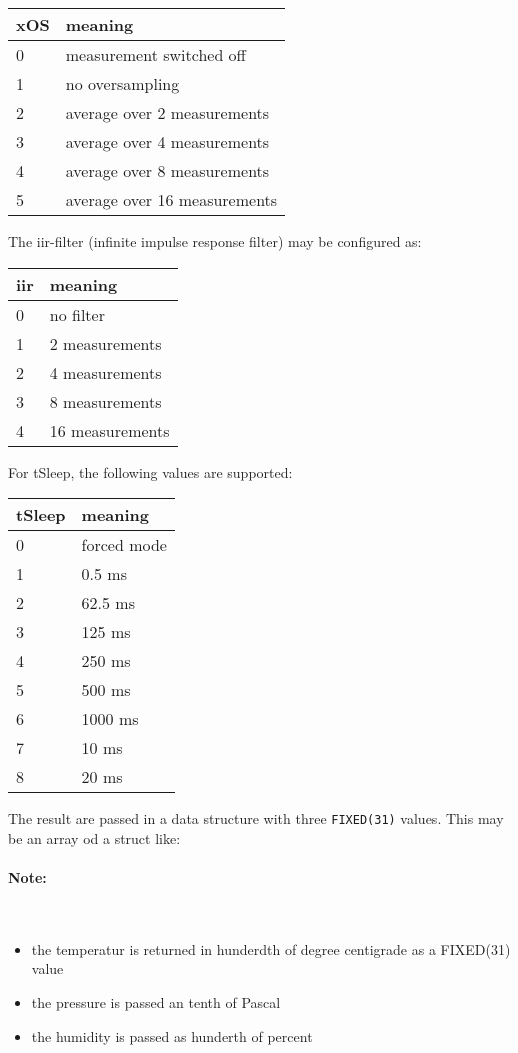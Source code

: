 \begin{tabular}{|l|l|}
\hline
xOS & meaning \\
\hline
0 & measurement switched off\\
1 & no oversampling \\
2 & average over 2 measurements \\
3 & average over 4 measurements \\
4 & average over 8 measurements \\
5 & average over 16 measurements \\
\hline
\end{tabular}

The iir-filter (infinite impulse response filter) may be configured as:

\begin{tabular}{|l|l|}
\hline
iir & meaning \\
\hline
0 & no filter \\
1 & 2 measurements \\
2 & 4 measurements \\
3 & 8 measurements \\
4 & 16 measurements \\
\hline
\end{tabular}

For tSleep, the following values are supported:

\begin{tabular}{|l|l|}
\hline
tSleep & meaning \\
\hline
0 & forced mode \\
1 & 0.5 ms \\
2 & 62.5 ms \\
3 & 125 ms \\
4 & 250 ms \\
5 & 500 ms \\
6 & 1000 ms \\
7 & 10 ms \\
8 & 20 ms \\
\hline
\end{tabular}

The result are passed in a data structure with three \texttt{FIXED(31)} values.
This may be an array od a struct like:
\paragraph{Note:}\ 
\begin{itemize}
\item the temperatur is returned in hunderdth of degree centigrade as a 
    FIXED(31) value
\item the pressure is passed an tenth of Pascal 
\item the humidity is passed as hunderth of percent
\end{itemize}


